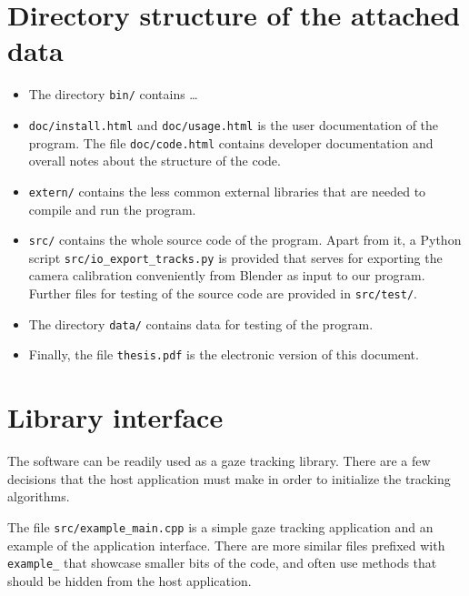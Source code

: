 
\setcounter{section}{0}
\renewcommand{\thesection}{\Alph{section}}

\section{Directory structure of the attached data}
\label{s:dirstructure}
\begin{itemize}
\item The directory {\tt bin/} contains \dots

\item {\tt doc/install.html} and {\tt doc/usage.html} is the user documentation of the program.
The file {\tt doc/code.html} contains developer documentation and overall notes about the structure of the code.

\item {\tt extern/} contains the less common external libraries that are needed to compile and run the program.

\item {\tt src/} contains the whole source code of the program.
Apart from it, a Python script {\tt src/io\_export\_tracks.py} is provided that serves for exporting the camera calibration conveniently from Blender as input to our program.
Further files for testing of the source code are provided in {\tt src/test/}.

\item The directory {\tt data/} contains data for testing of the program.

\item Finally, the file {\tt thesis.pdf} is the electronic version of this document.

\end{itemize}

\section{Library interface}

The software can be readily used as a gaze tracking library.
There are a few decisions that the host application must make in order to initialize the tracking algorithms.
\todo{\dots}

The file {\tt src/example\_main.cpp} is a simple gaze tracking application and an example of the application interface.
There are more similar files prefixed with {\tt example\_} that showcase smaller bits of the code, and often use methods that should be hidden from the host application.
